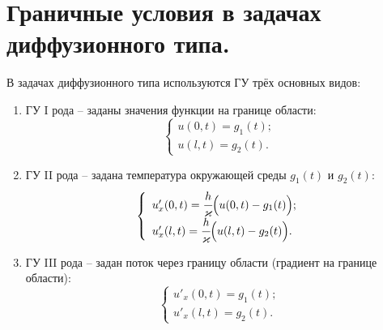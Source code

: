 \section{Граничные условия в задачах диффузионного типа.}

В задачах диффузионного типа используются ГУ трёх основных видов:
\begin{enumerate}
    \item ГУ I рода -- заданы значения функции на границе области:
    \[
        \left\{ \begin{array}{l}
            u(0, t) = g_1(t); \\
            u(l, t) = g_2(t).
        \end{array} \right.
    \]
    
    \item ГУ II рода -- задана температура окружающей среды \( g_1(t) \) и
    \( g_2(t) \):
    \[
        \left\{ \begin{array}{l}
            u'_x(0, t) = \cfrac{h}{\kappa}\Big(u(0, t) - g_1(t)\Big); \\
            u'_x(l, t) = \cfrac{h}{\kappa}\Big(u(l, t) - g_2(t)\Big).
        \end{array} \right.
    \]
    
    \item ГУ III рода -- задан поток через границу области (градиент на границе
    области):
    \[
        \left\{ \begin{array}{l}
            u'_x(0, t) = g_1(t); \\
            u'_x(l, t) = g_2(t).
        \end{array} \right.
    \]
\end{enumerate}

\newpage %
